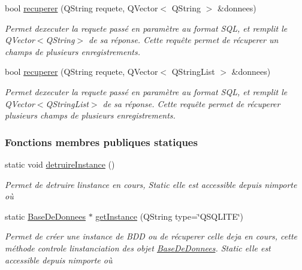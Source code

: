 \begin{DoxyCompactItemize}
bool \hyperlink{class_base_de_donnees_af9a76eb2b12df784280c379a4b22af62}{recuperer} (Q\+String requete, Q\+Vector$<$ Q\+String $>$ \&donnees)
\begin{DoxyCompactList}\small\item\em Permet d\textquotesingle{}executer la requete passé en paramètre au format S\+QL, et remplit le Q\+Vector$<$\+Q\+String$>$ de sa réponse. Cette requête permet de récuperer un champs de plusieurs enregistrements. \end{DoxyCompactList}\item 
bool \hyperlink{class_base_de_donnees_a68dd0d62ba03b9e8e5aa759d0666cb59}{recuperer} (Q\+String requete, Q\+Vector$<$ Q\+String\+List $>$ \&donnees)
\begin{DoxyCompactList}\small\item\em Permet d\textquotesingle{}executer la requete passé en paramètre au format S\+QL, et remplit le Q\+Vector$<$\+Q\+String\+List$>$ de sa réponse. Cette requête permet de récuperer plusieurs champs de plusieurs enregistrements. \end{DoxyCompactList}\end{DoxyCompactItemize}
\subsubsection*{Fonctions membres publiques statiques}
\begin{DoxyCompactItemize}
\item 
static void \hyperlink{class_base_de_donnees_a457401c0816b888c77ce915997545f4e}{detruire\+Instance} ()
\begin{DoxyCompactList}\small\item\em Permet de detruire l\textquotesingle{}instance en cours, Static elle est accessible depuis n\textquotesingle{}importe où \end{DoxyCompactList}\item 
static \hyperlink{class_base_de_donnees}{Base\+De\+Donnees} $\ast$ \hyperlink{class_base_de_donnees_a58beb2f702f75b257e2e55e25d9f979b}{get\+Instance} (Q\+String type=\char`\"{}Q\+S\+Q\+L\+I\+TE\char`\"{})
\begin{DoxyCompactList}\small\item\em Permet de créer une instance de B\+DD ou de récuperer celle deja en cours, cette méthode controle l\textquotesingle{}instanciation des objet \hyperlink{class_base_de_donnees}{Base\+De\+Donnees}. Static elle est accessible depuis n\textquotesingle{}importe où \end{DoxyCompactList}\end{DoxyCompactItemize}
